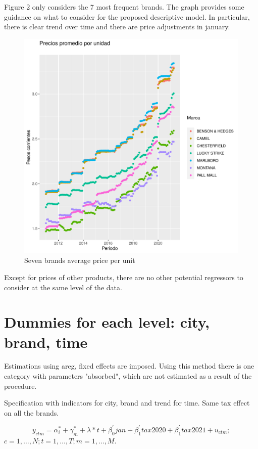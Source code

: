 \documentclass[]{article}
\begin{document}
Figure 2 only considers the 7 most frequent brands. The graph provides some guidance on what to consider for the proposed descriptive model.  In particular, there is clear trend over time and there are price adjustments in january. 

\begin{figure}
\begin{center}
		\includegraphics[width=\textwidth]{prin7_prom_ppu_marcas.pdf} 
\end{center}
 \caption{Seven brands average price per unit}
\end{figure}


Except for prices of other products, there are no other potential regressors to consider at the same level of the data.

\section{Dummies for each level: city, brand, time}
Estimations using areg, fixed effects are imposed. Using  this method there is one category with parameters "absorbed", which are not estimated as a result of the procedure.

Specification with indicators for city, brand and trend for time.
Same tax effect on all the brands.

\begin{equation*} 
y_{ctm}  = \alpha_{i}^{*} + \gamma_{m}^{*} + \lambda*t + \beta_{0}^{'}jan + \beta_{1}^{'}tax2020 + \beta_{1}^{'}tax2021 + u_{ctm}
;   \tag{2.1}
\end{equation*}
$c  = 1,\ldots,N;  t=1,\ldots,T; m=1,\ldots,M. $
\end{document}
